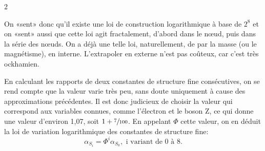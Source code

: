 \begin{multicols}{2}
\vspace*{-0.5cm}
\begin{center}
\end{center}

On «sent» donc qu'il existe une loi de construction logarithmique à base de $2^8$ et on «sent» aussi que cette loi agit fractalement, d'abord dans le nœud, puis dans la série des nœuds. On a déjà une telle loi, naturellement, de par la masse (ou le magnétisme), en interne. L'extrapoler en externe n'est pas coûteux, car c'est très ockhamien.

En calculant les rapports de deux constantes de structure fine consécutives, on se rend compte que la valeur varie très peu, sans doute uniquement à cause des approximations précédentes. Il est donc judicieux de choisir la valeur qui correspond aux variables connues, comme l'électron et le boson Z, ce qui donne une valeur d'environ 1,07, soit $1 + \sfrac{7}{100}$. En appelant $\Phi$ cette valeur, on en déduit la loi de variation logarithmique des constantes de structure fine:
\begin{equation}
	\label{eq:structure-fine}
	\alpha_{S_i} = \Phi^i \alpha_{S_0}, \text{ i variant de 0 à 8.} 
\end{equation}


\end{multicols}
